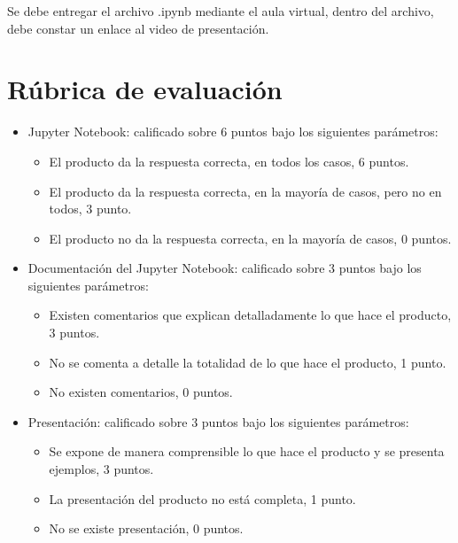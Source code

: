 \documentclass[a4,11pt]{aleph-notas}
\begin{document}
Se debe entregar el archivo .ipynb mediante el aula virtual, dentro del archivo, debe constar un enlace al video de presentación.

\section{Rúbrica de evaluación}

\begin{itemize}
\item
    Jupyter Notebook: calificado sobre 6 puntos bajo los siguientes parámetros:
    \begin{itemize}
        \item El producto da la respuesta correcta, en todos los casos, 6 puntos.
        \item El producto da la respuesta correcta, en la mayoría de casos, pero no en todos, 3 punto.
        \item El producto no da la respuesta correcta, en la mayoría de casos, 0 puntos.
    \end{itemize}

\item
    Documentación del Jupyter Notebook: calificado sobre 3 puntos bajo los siguientes parámetros:
    \begin{itemize}
        \item Existen comentarios que explican detalladamente lo que hace el producto, 3 puntos.
        \item No se comenta a detalle la totalidad de lo que hace el producto, 1 punto.
        \item No existen comentarios, 0 puntos.
    \end{itemize}

\item
    Presentación: calificado sobre 3 puntos bajo los siguientes parámetros:
    \begin{itemize}
        \item Se expone de manera comprensible lo que hace el producto y se presenta ejemplos, 3 puntos.
        \item La presentación del producto no está completa, 1 punto.
        \item No se existe presentación, 0 puntos.
    \end{itemize}
    
\end{itemize}
\end{document}
